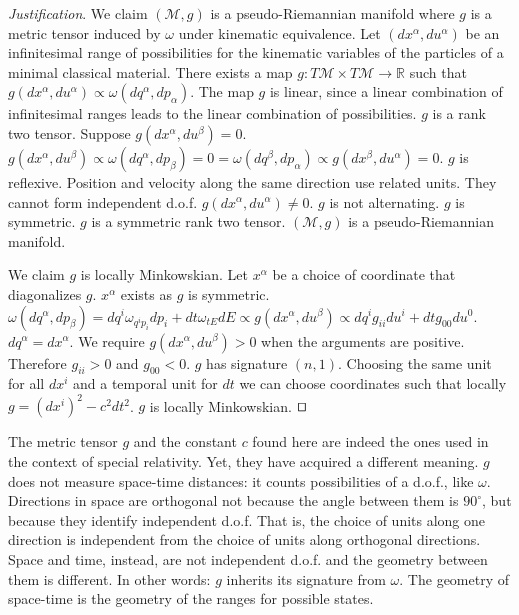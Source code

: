 \documentclass[smallextended]{svjour3}
\numberwithin{equation}{section}
\newenvironment{justification}{\emph{Justification}.}{\hfill\(\qed\)}
\theoremstyle{definition}
\newenvironment{justification}{\emph{Justification}.}{\qed}
\begin{document}
\begin{justification}
	We claim $(\mathcal{M}, g)$ is a pseudo-Riemannian manifold where $g$ is a metric tensor induced by $\omega$ under kinematic equivalence. Let $(dx^\alpha, du^\alpha)$ be an infinitesimal range of possibilities for the kinematic variables of the particles of a minimal classical material. There exists a map $g : T\mathcal{M} \times T\mathcal{M} \rightarrow \mathbb{R}$ such that $g(dx^\alpha, du^\alpha) \propto \omega(dq^\alpha, dp_\alpha)$. The map $g$ is linear, since a linear combination of infinitesimal ranges leads to the linear combination of possibilities. $g$ is a rank two tensor. Suppose $g(dx^\alpha, du^\beta) = 0$. $g(dx^\alpha, du^\beta) \propto \omega(dq^\alpha, dp_\beta) = 0 = \omega(dq^\beta, dp_\alpha) \propto g(dx^\beta, du^\alpha) = 0$. $g$ is reflexive. Position and velocity along the same direction use related units. They cannot form independent d.o.f. $g(dx^\alpha, du^\alpha) \neq 0$. $g$ is not alternating. $g$ is symmetric. $g$ is a symmetric rank two tensor. $(\mathcal{M}, g)$ is a pseudo-Riemannian manifold.
	
	We claim $g$ is locally Minkowskian. Let $x^\alpha$ be a choice of coordinate that diagonalizes $g$. $x^\alpha$ exists as $g$ is symmetric. $\omega(dq^\alpha, dp_\beta) = dq^i \omega_{q^ip_i} dp_i + dt \omega_{tE} dE \propto g(dx^\alpha, du^\beta) \propto dq^i g_{ii} du^i + dt g_{00} du^0$. $dq^\alpha = dx^\alpha$. We require $g(dx^\alpha, du^\beta)>0$ when the arguments are positive. Therefore $g_{ii} > 0$ and $g_{00} < 0$. $g$ has signature $(n, 1)$. Choosing the same unit for all $dx^i$ and a temporal unit for $dt$ we can choose coordinates such that locally $g = (dx^i)^2 - c^2 dt^2$. $g$ is locally Minkowskian.
\end{justification}

The metric tensor $g$ and the constant $c$ found here are indeed the ones used in the context of special relativity. Yet, they have acquired a different meaning. $g$ does not measure space-time distances: it counts possibilities of a d.o.f., like $\omega$. Directions in space are orthogonal not because the angle between them is $90^\circ$, but because they identify independent d.o.f. That is, the choice of units along one direction is independent from the choice of units along orthogonal directions. Space and time, instead, are not independent d.o.f. and the geometry between them is different. In other words: $g$ inherits its signature from $\omega$. The geometry of space-time is the geometry of the ranges for possible states.
\end{document}

